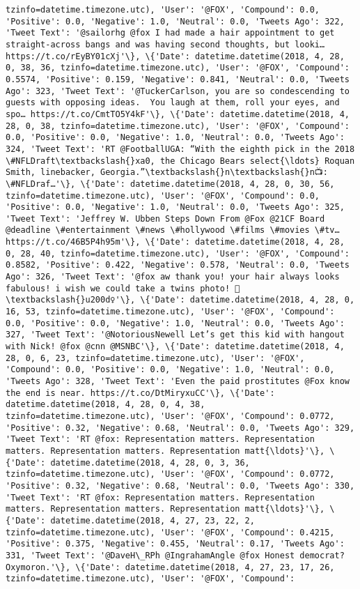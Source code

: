 \documentclass[11pt]{article}
\begin{document}
\begin{Verbatim}[commandchars=\\\{\}]
tzinfo=datetime.timezone.utc), 'User': '@FOX', 'Compound': 0.0, 'Positive': 0.0, 'Negative': 1.0, 'Neutral': 0.0, 'Tweets Ago': 322, 'Tweet Text': '@sailorhg @fox I had made a hair appointment to get straight-across bangs and was having second thoughts, but looki… https://t.co/rEyBY01cXj'\}, \{'Date': datetime.datetime(2018, 4, 28, 0, 38, 36, tzinfo=datetime.timezone.utc), 'User': '@FOX', 'Compound': 0.5574, 'Positive': 0.159, 'Negative': 0.841, 'Neutral': 0.0, 'Tweets Ago': 323, 'Tweet Text': '@TuckerCarlson, you are so condescending to guests with opposing ideas.  You laugh at them, roll your eyes, and spo… https://t.co/CmtTO5Y4kF'\}, \{'Date': datetime.datetime(2018, 4, 28, 0, 38, tzinfo=datetime.timezone.utc), 'User': '@FOX', 'Compound': 0.0, 'Positive': 0.0, 'Negative': 1.0, 'Neutral': 0.0, 'Tweets Ago': 324, 'Tweet Text': 'RT @FootballUGA: “With the eighth pick in the 2018 \#NFLDraft\textbackslash{}xa0, the Chicago Bears select{\ldots} Roquan Smith, linebacker, Georgia.”\textbackslash{}n\textbackslash{}n📺: \#NFLDraf…'\}, \{'Date': datetime.datetime(2018, 4, 28, 0, 30, 56, tzinfo=datetime.timezone.utc), 'User': '@FOX', 'Compound': 0.0, 'Positive': 0.0, 'Negative': 1.0, 'Neutral': 0.0, 'Tweets Ago': 325, 'Tweet Text': 'Jeffrey W. Ubben Steps Down From @Fox @21CF Board @deadline \#entertainment \#news \#hollywood \#films \#movies \#tv… https://t.co/46B5P4h95m'\}, \{'Date': datetime.datetime(2018, 4, 28, 0, 28, 40, tzinfo=datetime.timezone.utc), 'User': '@FOX', 'Compound': 0.8582, 'Positive': 0.422, 'Negative': 0.578, 'Neutral': 0.0, 'Tweets Ago': 326, 'Tweet Text': '@fox aw thank you! your hair always looks fabulous! i wish we could take a twins photo! 👯\textbackslash{}u200d♀️'\}, \{'Date': datetime.datetime(2018, 4, 28, 0, 16, 53, tzinfo=datetime.timezone.utc), 'User': '@FOX', 'Compound': 0.0, 'Positive': 0.0, 'Negative': 1.0, 'Neutral': 0.0, 'Tweets Ago': 327, 'Tweet Text': '@NotoriousNewell Let’s get this kid with hangout with Nick! @fox @cnn @MSNBC'\}, \{'Date': datetime.datetime(2018, 4, 28, 0, 6, 23, tzinfo=datetime.timezone.utc), 'User': '@FOX', 'Compound': 0.0, 'Positive': 0.0, 'Negative': 1.0, 'Neutral': 0.0, 'Tweets Ago': 328, 'Tweet Text': 'Even the paid prostitutes @Fox know the end is near. https://t.co/DtMiryxuCC'\}, \{'Date': datetime.datetime(2018, 4, 28, 0, 4, 38, tzinfo=datetime.timezone.utc), 'User': '@FOX', 'Compound': 0.0772, 'Positive': 0.32, 'Negative': 0.68, 'Neutral': 0.0, 'Tweets Ago': 329, 'Tweet Text': 'RT @fox: Representation matters. Representation matters. Representation matters. Representation matt{\ldots}'\}, \{'Date': datetime.datetime(2018, 4, 28, 0, 3, 36, tzinfo=datetime.timezone.utc), 'User': '@FOX', 'Compound': 0.0772, 'Positive': 0.32, 'Negative': 0.68, 'Neutral': 0.0, 'Tweets Ago': 330, 'Tweet Text': 'RT @fox: Representation matters. Representation matters. Representation matters. Representation matt{\ldots}'\}, \{'Date': datetime.datetime(2018, 4, 27, 23, 22, 2, tzinfo=datetime.timezone.utc), 'User': '@FOX', 'Compound': 0.4215, 'Positive': 0.375, 'Negative': 0.455, 'Neutral': 0.17, 'Tweets Ago': 331, 'Tweet Text': '@DaveH\_RPh @IngrahamAngle @fox Honest democrat?  Oxymoron.'\}, \{'Date': datetime.datetime(2018, 4, 27, 23, 17, 26, tzinfo=datetime.timezone.utc), 'User': '@FOX', 'Compound': 
\end{Verbatim}
\end{document}
